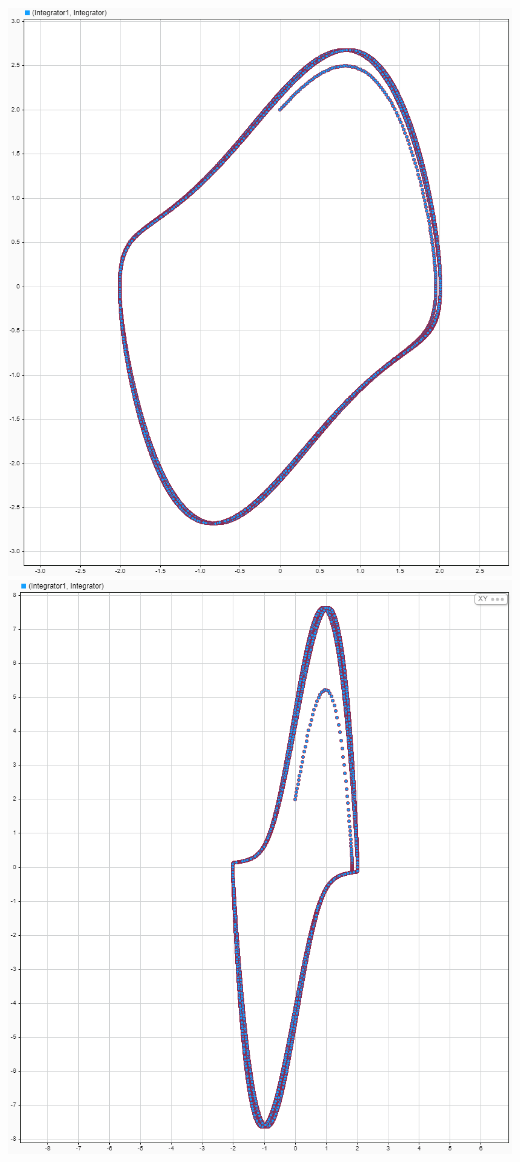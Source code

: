 \documentclass{scrartcl}
\begin{document}
\includegraphics[scale=0.3]{E4mu1.png}\\
\includegraphics[scale=0.3]{E4mu5.png}
\end{document}
